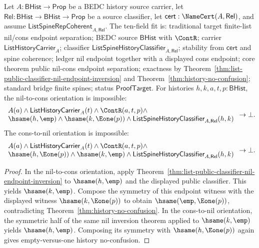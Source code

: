 \begin{theorem}
\label{thm:list-public-classifier-nil-cons-endpoint-separation}
Let $A:\mathsf{BHist}\to\mathsf{Prop}$ be a BEDC history source carrier, let
$\mathsf{Rel}:\mathsf{BHist}\to\mathsf{BHist}\to\mathsf{Prop}$ be a source
classifier, let $\mathsf{cert}:\NameCert(A,\mathsf{Rel})$, and assume
$\mathsf{ListSpineRepCoherent}_{A,\mathsf{Rel}}$. The ten-field fit is:
traditional target finite-list nil/cons endpoint separation; BEDC source
$\mathsf{BHist}$ with $\ContR$; carrier $\mathsf{ListHistoryCarrier}_A$;
classifier $\mathsf{ListSpineHistoryClassifier}_{A,\mathsf{Rel}}$; stability
from $\mathsf{cert}$ and spine coherence; ledger nil endpoint together with a
displayed cons endpoint; core theorem public nil-cons endpoint separation;
exactness by Theorem~\ref{thm:list-public-classifier-nil-endpoint-inversion}
and Theorem~\ref{thm:history-no-confusion}; standard bridge finite spines;
status $\mathsf{ProofTarget}$. For histories $h,k,a,t,p:\mathsf{BHist}$, the
nil-to-cons orientation is impossible:
$$
\begin{array}{l}
A(a)\land \mathsf{ListHistoryCarrier}_A(t)\land
\ContR(a,t,p)\land\\
\hsame(h,\emp)\land \hsame(k,\Eone(p))\land
\mathsf{ListSpineHistoryClassifier}_{A,\mathsf{Rel}}(h,k)
\end{array}
\to \bot.
$$
The cons-to-nil orientation is impossible:
$$
\begin{array}{l}
A(a)\land \mathsf{ListHistoryCarrier}_A(t)\land
\ContR(a,t,p)\land\\
\hsame(h,\Eone(p))\land \hsame(k,\emp)\land
\mathsf{ListSpineHistoryClassifier}_{A,\mathsf{Rel}}(h,k)
\end{array}
\to \bot.
$$
\end{theorem}
\begin{proof}
In the nil-to-cons orientation, apply
Theorem~\ref{thm:list-public-classifier-nil-endpoint-inversion} to
$\hsame(h,\emp)$ and the displayed public classifier. This yields
$\hsame(k,\emp)$. Compose the symmetry of this endpoint witness with the
displayed witness $\hsame(k,\Eone(p))$ to obtain $\hsame(\emp,\Eone(p))$,
contradicting Theorem~\ref{thm:history-no-confusion}. In the cons-to-nil
orientation, the symmetric half of the same nil inversion theorem applied to
$\hsame(k,\emp)$ yields $\hsame(h,\emp)$. Composing its symmetry with
$\hsame(h,\Eone(p))$ again gives empty-versus-one history no-confusion.
\end{proof}

